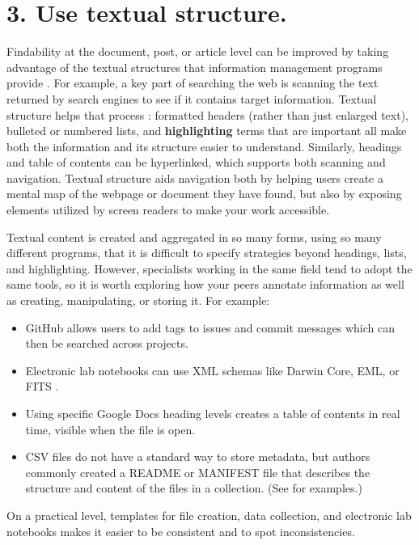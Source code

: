 \documentclass[10pt,letterpaper]{article}
\newcommand{\rulemajor}[1]{\section*{#1}}
\begin{document}
\rulemajor{3. Use textual structure.}

Findability at the document, post, or article level can be improved by taking
advantage of the textual structures that information management programs provide
\cite{Hedden2016}. For example, a key part of searching the web is scanning the
text returned by search engines to see if it contains target information.
Textual structure helps that process \cite{Krug2014}: formatted headers (rather
than just enlarged text), bulleted or numbered lists, and \textbf{highlighting}
terms that are important all make both the information and its structure easier
to understand. Similarly, headings and table of contents can be hyperlinked,
which supports both scanning and navigation. Textual structure aids navigation
both by helping users create a mental map of the webpage or document they have
found, but also by exposing elements utilized by screen readers to make your
work accessible.

Textual content is created and aggregated in so many forms, using so many
different programs, that it is difficult to specify strategies beyond headings,
lists, and highlighting. However, specialists working in the same field tend to
adopt the same tools, so it is worth exploring how your peers annotate
information as well as creating, manipulating, or storing it. For example:

\begin{itemize}

\item
  GitHub allows users to add tags to issues and commit messages which can then
  be searched across projects.

\item
  Electronic lab notebooks can use XML schemas like Darwin Core, EML, or FITS
  \cite{Briney2015}.

\item
  Using specific Google Docs heading levels creates a table of contents in real
  time, visible when the file is open.

\item
  CSV files do not have a standard way to store metadata, but authors commonly
  created a README or MANIFEST file that describes the structure and content of
  the files in a collection. (See \cite{Pudding} for examples.)

\end{itemize}

On a practical level, templates for file creation, data collection, and electronic 
lab notebooks makes it easier to be consistent and to spot inconsistencies.
\end{document}
